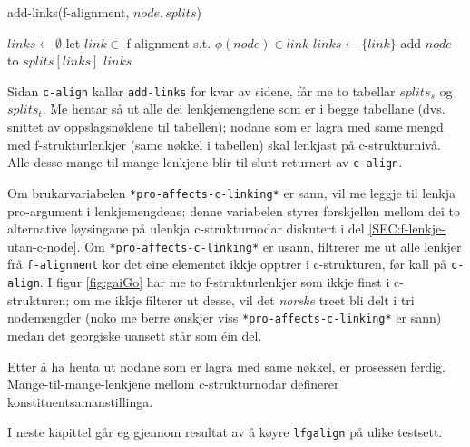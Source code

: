 \documentclass[12pt,a4paper,oneside,draft]{report}
\begin{document}
   \begin{algorithm}[]
   \caption{add-links(f-alignment, $node, splits$)}
   \label{algo:add-links}
      
        $links \gets \emptyset$\;
    {
        {
          let $link \in$ f-alignment s.t. $\phi(node) \in link$ \;
           {$links \gets \{link\}$} \;
           {
          }
        }
        add $node$ to $splits[links]$ \;
       }
        \Return $links$ \;
  \end{algorithm}

Sidan \texttt{c-align} kallar \texttt{add-links} for kvar av sidene, får me to
 tabellar $splits_s$ og $splits_t$.  Me hentar så ut alle dei
 lenkjemengdene som er i begge tabellane (dvs. snittet av
 oppslagsnøklene til tabellen); nodane som er lagra med same mengd med
 f-strukturlenkjer (same nøkkel i tabellen) skal lenkjast på
 c-strukturnivå. Alle desse mange-til-mange-lenkjene blir til slutt
 returnert av \texttt{c-align}.

 Om brukarvariabelen \texttt{*pro-affects-c-linking*} er sann, vil me leggje
 til lenkja pro-argument i lenkjemengdene; denne variabelen styrer
 forskjellen mellom dei to alternative løysingane på ulenkja
 c-strukturnodar diskutert i del \ref{SEC:f-lenkje-utan-c-node}. Om
 \texttt{*pro-affects-c-linking*} er usann, filtrerer me ut alle lenkjer frå
 \texttt{f-alignment} kor det eine elementet ikkje opptrer i c-strukturen,
 før kall på \texttt{c-align}.  I figur \ref{fig:gaiGo} har me to
 f-strukturlenkjer som ikkje finst i c-strukturen; om me ikkje
 filterer ut desse, vil det \emph{norske} treet bli delt i tri nodemengder
 (noko me berre ønskjer viss \texttt{*pro-affects-c-linking*} er sann) medan
 det georgiske uansett står som éin del.

Etter å ha henta ut nodane som er lagra med same nøkkel, er prosessen
 ferdig. Mange-til-mange-lenkjene mellom c-strukturnodar definerer
 konstituentsamanstillinga.

I neste kapittel går eg gjennom resultat av å køyre \texttt{lfgalign} på
 ulike testsett.
\end{document}
